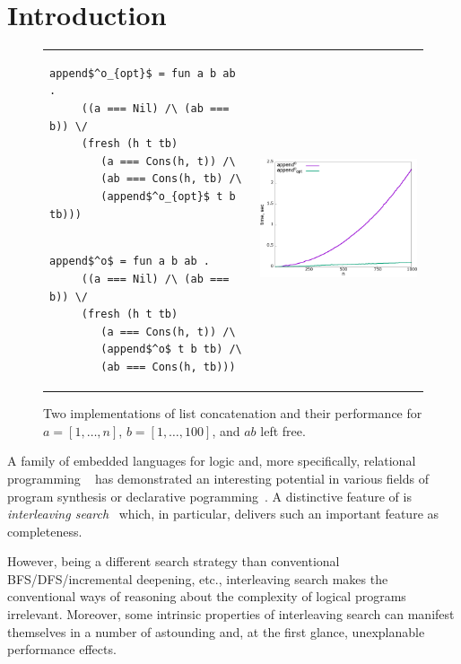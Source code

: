 \section{Introduction}
\label{sec:intro}

\begin{figure}[t]
\begin{tabular}{p{6cm}p{6cm}}
\begin{lstlisting}[basicstyle=\small]
   append$^o_{opt}$ = fun a b ab .
     ((a === Nil) /\ (ab === b)) \/
     (fresh (h t tb)
        (a === Cons(h, t)) /\
        (ab === Cons(h, tb) /\
        (append$^o_{opt}$ t b tb)))
\end{lstlisting} & \multirow{2}{*}[-3mm]{\includegraphics[width=6cm,height=5cm]{append_without_oc.png}} \\[-9mm]
\begin{lstlisting}[basicstyle=\small]
   append$^o$ = fun a b ab .
     ((a === Nil) /\ (ab === b)) \/
     (fresh (h t tb)
        (a === Cons(h, t)) /\
        (append$^o$ t b tb) /\
        (ab === Cons(h, tb)))
\end{lstlisting} &
\end{tabular}
\caption{Two implementations of list concatenation and their performance for $a = [1,\dots,n]$, $b = [1,\dots,100]$, and $ab$ left free.}
\label{fig:length_implementations}
\end{figure}

A family of embedded languages for logic and, more specifically, relational programming \mK~\cite{TRS} has demonstrated an interesting potential in various fields of 
program synthesis or declarative pogramming~\cite{SevenProblems,Quines,Matching}. A distinctive feature of \mK is \emph{interleaving search}~\cite{Transformers} which,
in particular, delivers such an important feature as completeness.

However, being a different search strategy than conventional BFS/DFS/incremental deepening, etc., interleaving search makes the conventional ways of reasoning about the complexity
of logical programs irrelevant. Moreover, some intrinsic properties of interleaving search can manifest themselves in a number of astounding and, at the first glance, unexplanable
performance effects. 

